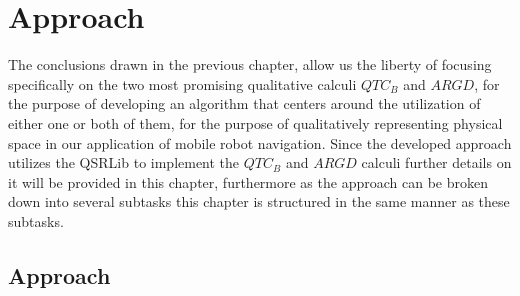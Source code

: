 
\chapter{Approach}
The conclusions drawn in the previous chapter, allow us the liberty of focusing specifically on the two most promising qualitative calculi $QTC_B$ and $ARGD$, for the purpose of developing an algorithm that centers around the utilization of either one or both of them, for the purpose of qualitatively representing physical space in our application of mobile robot navigation. Since the developed approach utilizes the QSRLib to implement the $QTC_B$ and $ARGD$ calculi further details on it will be provided in this chapter, furthermore as the approach can be broken down into several subtasks this chapter is structured in the same manner as these subtasks.



\section{Approach}
